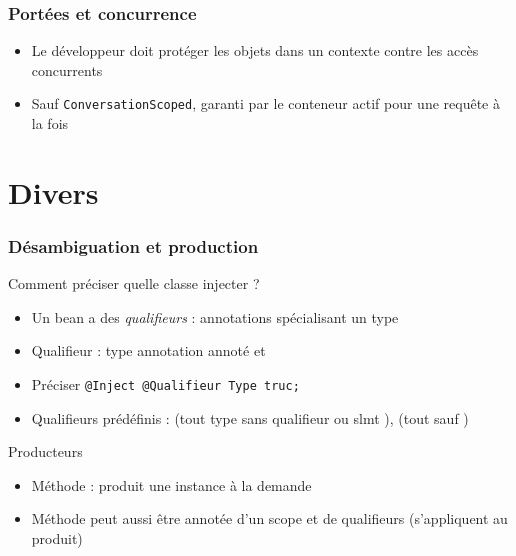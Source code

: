 \documentclass[english, french]{beamer}
\begin{document}
\begin{frame}
	\frametitle{Portées et concurrence}
	\begin{itemize}
		\item Le développeur doit protéger les objets dans un contexte contre les accès concurrents
		\item Sauf \texttt{ConversationScoped}, garanti par le conteneur actif pour une requête à la fois
	\end{itemize}
\end{frame}

\section{Divers}
\begin{frame}
	\frametitle{Désambiguation et production}
	Comment préciser quelle classe injecter ?
	\begin{itemize}
		\item Un bean a des \emph{qualifieurs} : annotations spécialisant un type
		\item Qualifieur : type annotation annoté   et 
		\item Préciser \texttt{@Inject @Qualifieur Type truc;}
		\item {\tiny Qualifieurs prédéfinis :  (tout type sans qualifieur {\tiny ou slmt }),  (tout {\tiny sauf })}
	\end{itemize}
	\begin{block}{Producteurs}
		\begin{itemize}
			\item Méthode  : produit une instance à la demande
			\item Méthode peut aussi être annotée d’un scope et de qualifieurs (s’appliquent au produit)
		\end{itemize}
	\end{block}
\end{frame}
\end{document}
